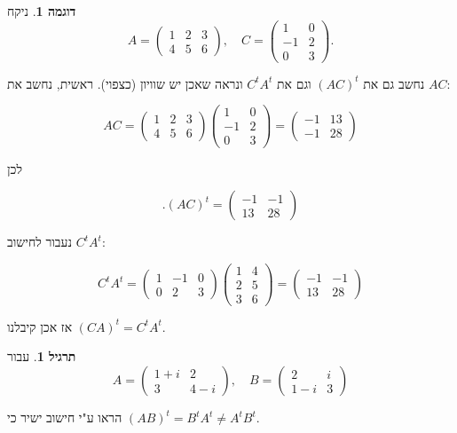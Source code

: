 \documentclass[12pt]{report}
\theoremstyle{plain}
\theoremstyle{definition}
\newtheorem{example}{דוגמה}[chapter]
\newtheorem{exercise}{תרגיל}[chapter]
\newcommand{\0}{\mathbf{0}}
\begin{document}
\begin{example}
ניקח
$$
A = \begin{pmatrix}
1 & 2 & 3 \\
4 & 5 & 6
\end{pmatrix}, \quad
C = \begin{pmatrix}
1 & 0 \\
-1 & 2 \\
0 & 3
\end{pmatrix}.
$$

נחשב גם את
$(AC)^t$
וגם את
$C^tA^t$
ונראה שאכן יש שוויון (כצפוי). ראשית, נחשב את
$AC$:

$$
AC=
\begin{pmatrix}
1 & 2 & 3 \\
4 & 5 & 6
\end{pmatrix}
\begin{pmatrix}
1 & 0 \\
-1 & 2 \\
0 & 3
\end{pmatrix}
=
\begin{pmatrix}
-1 & 13 \\
-1 & 28
\end{pmatrix}
$$

לכן

$$
.(AC)^t=\begin{pmatrix}
-1 & -1 \\
13 & 28
\end{pmatrix}
$$

נעבור לחישוב
$C^tA^t$:

$$
C^t A^t=
\begin{pmatrix}
1 & -1 & 0 \\
0 & 2 & 3
\end{pmatrix}
\begin{pmatrix}
1 & 4 \\
2 & 5 \\
3 & 6
\end{pmatrix}
=
\begin{pmatrix}
-1 & -1 \\
13 & 28
\end{pmatrix}
$$

אז אכן קיבלנו 
$(CA)^t=C^tA^t$.
\end{example}

\begin{exercise}
עבור
$$
A = \begin{pmatrix}
1+i & 2 \\
3 & 4-i
\end{pmatrix}, \quad
B = \begin{pmatrix}
2 & i \\
1-i & 3
\end{pmatrix}
$$

הראו ע"י חישוב ישיר כי
$(AB)^t=B^tA^t\neq A^tB^t$.
\end{exercise}
\end{document}
